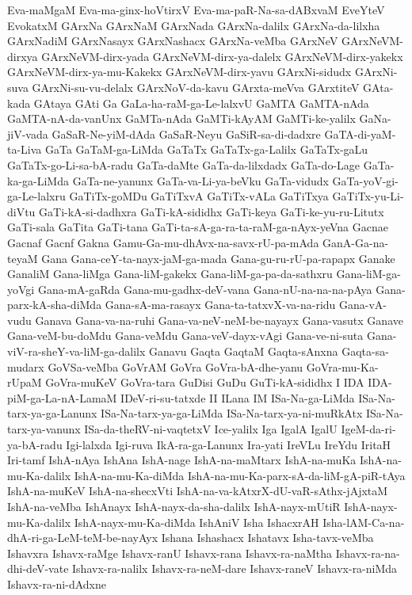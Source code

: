 {Eva-maMgaM
Eva-ma-ginx-hoVtirxV
Eva-ma-paR-Na-sa-dABxvaM
EveYteV
EvokatxM
GArxNa
GArxNaM
GArxNada
GArxNa-dalilx
GArxNa-da-lilxha
GArxNadiM
GArxNasayx
GArxNashacx
GArxNa-veMba
GArxNeV
GArxNeVM-dirxya
GArxNeVM-dirx-yada
GArxNeVM-dirx-ya-dalelx
GArxNeVM-dirx-yakekx
GArxNeVM-dirx-ya-mu-Kakekx
GArxNeVM-dirx-yavu
GArxNi-sidudx
GArxNi-suva
GArxNi-su-vu-delalx
GArxNoV-da-kavu
GArxta-meVva
GArxtiteV
GAta-kada
GAtaya
GAti
Ga
GaLa-ha-raM-ga-Le-lalxvU
GaMTA
GaMTA-nAda
GaMTA-nA-da-vanUnx
GaMTa-nAda
GaMTi-kAyAM
GaMTi-ke-yalilx
GaNa-jiV-vada
GaSaR-Ne-yiM-dAda
GaSaR-Neyu
GaSiR-sa-di-dadxre
GaTA-di-yaM-ta-Liva
GaTa
GaTaM-ga-LiMda
GaTaTx
GaTaTx-ga-Lalilx
GaTaTx-gaLu
GaTaTx-go-Li-sa-bA-radu
GaTa-daMte
GaTa-da-lilxdadx
GaTa-do-Lage
GaTa-ka-ga-LiMda
GaTa-ne-yanunx
GaTa-va-Li-ya-beVku
GaTa-vidudx
GaTa-yoV-gi-ga-Le-lalxru
GaTiTx-goMDu
GaTiTxvA
GaTiTx-vALa
GaTiTxya
GaTiTx-yu-Li-diVtu
GaTi-kA-si-dadhxra
GaTi-kA-sididhx
GaTi-keya
GaTi-ke-yu-ru-Litutx
GaTi-sala
GaTita
GaTi-tana
GaTi-ta-sA-ga-ra-ta-raM-ga-nAyx-yeVna
Gacnae
Gacnaf
Gacnf
Gakna
Gamu-Ga-mu-dhAvx-na-savx-rU-pa-mAda
GanA-Ga-na-teyaM
Gana
Gana-ceY-ta-nayx-jaM-ga-mada
Gana-gu-ru-rU-pa-rapapx
Ganake
GanaliM
Gana-liMga
Gana-liM-gakekx
Gana-liM-ga-pa-da-sathxru
Gana-liM-ga-yoVgi
Gana-mA-gaRda
Gana-mu-gadhx-deV-vana
Gana-nU-na-na-na-pAya
Gana-parx-kA-sha-diMda
Gana-sA-ma-rasayx
Gana-ta-tatxvX-va-na-ridu
Gana-vA-vudu
Ganava
Gana-va-na-ruhi
Gana-va-neV-neM-be-nayayx
Gana-vasutx
Ganave
Gana-veM-bu-doMdu
Gana-veMdu
Gana-veV-dayx-vAgi
Gana-ve-ni-suta
Gana-viV-ra-sheY-va-liM-ga-dalilx
Ganavu
Gaqta
GaqtaM
Gaqta-sAnxna
Gaqta-sa-mudarx
GoVSa-veMba
GoVrAM
GoVra
GoVra-bA-dhe-yanu
GoVra-mu-Ka-rUpaM
GoVra-muKeV
GoVra-tara
GuDisi
GuDu
GuTi-kA-sididhx
I
IDA
IDA-piM-ga-La-nA-LamaM
IDeV-ri-su-tatxde
II
ILana
IM
ISa-Na-ga-LiMda
ISa-Na-tarx-ya-ga-Lanunx
ISa-Na-tarx-ya-ga-LiMda
ISa-Na-tarx-ya-ni-muRkAtx
ISa-Na-tarx-ya-vanunx
ISa-da-theRV-ni-vaqtetxV
Ice-yalilx
Iga
IgalA
IgalU
IgeM-da-ri-ya-bA-radu
Igi-lalxda
Igi-ruva
IkA-ra-ga-Lanunx
Ira-yati
IreVLu
IreYdu
IritaH
Iri-tamf
IshA-nAya
IshAna
IshA-nage
IshA-na-maMtarx
IshA-na-muKa
IshA-na-mu-Ka-dalilx
IshA-na-mu-Ka-diMda
IshA-na-mu-Ka-parx-sA-da-liM-gA-piR-tAya
IshA-na-muKeV
IshA-na-shecxVti
IshA-na-va-kAtxrX-dU-vaR-sAthx-jAjxtaM
IshA-na-veMba
IshAnayx
IshA-nayx-da-sha-dalilx
IshA-nayx-mUtiR
IshA-nayx-mu-Ka-dalilx
IshA-nayx-mu-Ka-diMda
IshAniV
Isha
IshacxrAH
Isha-lAM-Ca-na-dhA-ri-ga-LeM-teM-be-nayAyx
Ishana
Ishashacx
Ishatavx
Isha-tavx-veMba
Ishavxra
Ishavx-raMge
Ishavx-ranU
Ishavx-rana
Ishavx-ra-naMtha
Ishavx-ra-na-dhi-deV-vate
Ishavx-ra-nalilx
Ishavx-ra-neM-dare
Ishavx-raneV
Ishavx-ra-niMda
Ishavx-ra-ni-dAdxne
}
